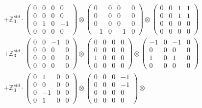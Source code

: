 \documentclass{article}
\begin{document}
{\begin{align}
        &+ \label{Rs16-Rc11-Solution-28-c22} \mathbb{Z}_3^{std} \cdot 
            \begin{pmatrix} 0 & 0 & 0 & 0 \\ 0 & 0 & 0 & 0 \\ 0 & 1 & 0 & -1 \\ 0 & 0 & 0 & 0 \end{pmatrix} \otimes 
            \begin{pmatrix} 0 & 0 & 0 & 0 \\ 0 & 0 & 0 & 0 \\ 0 & 0 & 0 & 0 \\ -1 & 0 & -1 & 0 \end{pmatrix} \otimes 
            \begin{pmatrix} 0 & 0 & 1 & 1 \\ 0 & 0 & 1 & 1 \\ 0 & 0 & 0 & 0 \\ 0 & 0 & 0 & 0 \end{pmatrix} \\ 
        &+ \label{Rs16-Rc11-Solution-28-c23} \mathbb{Z}_3^{std} \cdot 
            \begin{pmatrix} 0 & 0 & -1 & 0 \\ 0 & 0 & 0 & 0 \\ 0 & 0 & 0 & 0 \\ 0 & 0 & 0 & 0 \end{pmatrix} \otimes 
            \begin{pmatrix} 0 & 0 & 0 & 0 \\ 0 & 0 & 0 & 0 \\ 1 & 0 & 0 & 0 \\ 0 & 0 & 0 & 0 \end{pmatrix} \otimes 
            \begin{pmatrix} -1 & 0 & -1 & 0 \\ 0 & 0 & 0 & 0 \\ 1 & 0 & 1 & 0 \\ 0 & 0 & 0 & 0 \end{pmatrix} \\ 
        &+ \label{Rs16-Rc11-Solution-28-c24} \mathbb{Z}_3^{std} \cdot 
            \begin{pmatrix} 0 & 1 & 0 & 0 \\ 0 & 0 & 0 & 0 \\ 0 & -1 & 0 & 0 \\ 0 & 1 & 0 & 0 \end{pmatrix} \otimes 
            \begin{pmatrix} 0 & 0 & 0 & -1 \\ 0 & 0 & 0 & -1 \\ 0 & 0 & 0 & 0 \\ 0 & 0 & 0 & 0 \end{pmatrix} \otimes 

\end{align}}
\end{document}
